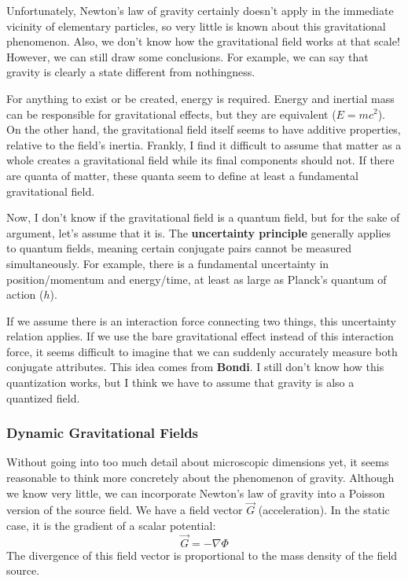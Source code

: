 \documentclass[11pt,a4paper,oneside]{article}
\begin{document}
Unfortunately, Newton's law of gravity certainly doesn't apply in the immediate vicinity of elementary particles, so very little is known about this gravitational phenomenon. Also, we don't know how the gravitational field works at that scale! However, we can still draw some conclusions. For example, we can say that gravity is clearly a state different from nothingness.

For anything to exist or be created, energy is required. Energy and inertial mass can be responsible for gravitational effects, but they are equivalent ($E=mc^2$). On the other hand, the gravitational field itself seems to have additive properties, relative to the field's inertia. Frankly, I find it difficult to assume that matter as a whole creates a gravitational field while its final components should not. If there are quanta of matter, these quanta seem to define at least a fundamental gravitational field.


Now, I don't know if the gravitational field is a quantum field, but for the sake of argument, let's assume that it is. The \textbf{uncertainty principle} generally applies to quantum fields, meaning certain conjugate pairs cannot be measured simultaneously. For example, there is a fundamental uncertainty in position/momentum and energy/time, at least as large as Planck's quantum of action ($h$).

If we assume there is an interaction force connecting two things, this uncertainty relation applies. If we use the bare gravitational effect instead of this interaction force, it seems difficult to imagine that we can suddenly accurately measure both conjugate attributes. This idea comes from \textbf{Bondi}. I still don't know how this quantization works, but I think we have to assume that gravity is also a quantized field.

\subsubsection{Dynamic Gravitational Fields}

Without going into too much detail about microscopic dimensions yet, it seems reasonable to think more concretely about the phenomenon of gravity. Although we know very little, we can incorporate Newton's law of gravity into a Poisson version of the source field. We have a field vector $\vec{G}$ (acceleration). In the static case, it is the gradient of a scalar potential:
\begin{equation}
    \vec{G} = -\nabla \Phi
\end{equation}
The divergence of this field vector is proportional to the mass density of the field source.
\end{document}
